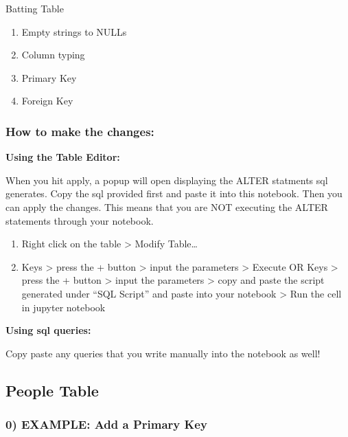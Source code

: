 \documentclass[11pt]{article}
\providecommand{\tightlist}{%
      \setlength{\itemsep}{0pt}\setlength{\parskip}{0pt}}
\begin{document}
Batting Table

\begin{enumerate}
\def\labelenumi{\arabic{enumi}.}
\tightlist
\item
  Empty strings to NULLs
\item
  Column typing
\item
  Primary Key
\item
  Foreign Key
\end{enumerate}

\hypertarget{how-to-make-the-changes}{%
\subsubsection{How to make the changes:}\label{how-to-make-the-changes}}

\textbf{Using the Table Editor:}

When you hit apply, a popup will open displaying the ALTER statments sql
generates. Copy the sql provided first and paste it into this notebook.
Then you can apply the changes. This means that you are NOT executing
the ALTER statements through your notebook.

\begin{enumerate}
\def\labelenumi{\arabic{enumi}.}
\item
  Right click on the table \textgreater{} Modify Table\ldots{}
\item
  Keys \textgreater{} press the + button \textgreater{} input the
  parameters \textgreater{} Execute OR Keys \textgreater{} press the +
  button \textgreater{} input the parameters \textgreater{} copy and
  paste the script generated under ``SQL Script'' and paste into your
  notebook \textgreater{} Run the cell in jupyter notebook
\end{enumerate}

\textbf{Using sql queries:}

Copy paste any queries that you write manually into the notebook as
well!

    \hypertarget{people-table}{%
\subsection{People Table}\label{people-table}}

\hypertarget{example-add-a-primary-key}{%
\subsubsection{0) EXAMPLE: Add a Primary
Key}\label{example-add-a-primary-key}}
\end{document}
